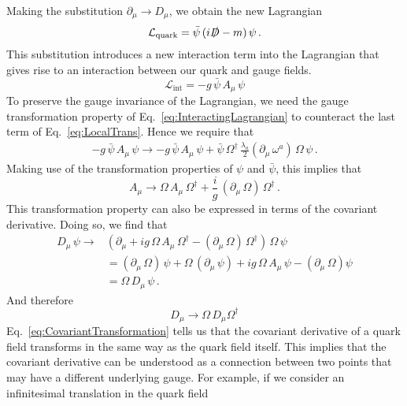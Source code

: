 Making the substitution $\partial_\mu\rightarrow D_\mu$, we obtain the new Lagrangian
%
\begin{equation}
\mathcal{L}_\text{quark} = \bar{\psi}\,(i\slashed{D}-m)\,\psi\,.
\end{equation}
%
This substitution introduces a new interaction term into the Lagrangian that gives rise to an interaction between our quark and gauge fields.
%
\begin{equation}
\mathcal{L}_\text{int} = -g\,\bar{\psi}\,A_\mu\,\psi
\label{eq:InteractingLagrangian}
\end{equation}
%
To preserve the gauge invariance of the Lagrangian, we need the gauge transformation property of Eq.~\ref{eq:InteractingLagrangian} to counteract the last term of Eq.~\ref{eq:LocalTrans}. Hence we require that
%
\begin{align}
-g\,\bar{\psi}\,A_\mu\,\psi \rightarrow -g\,\bar{\psi}\,A_\mu\,\psi + \bar{\psi}\,\Omega^\dag\,\frac{\lambda_a}{2}(\partial_\mu\,\omega^a)\,\Omega\,\psi\, .
\end{align}
%
Making use of the transformation properties of $\psi$ and $\bar{\psi}$, this implies that
%
\begin{equation}
A_\mu\rightarrow \Omega\,A_\mu\,\Omega^\dag + \frac{i}{g}\,(\partial_\mu\,\Omega)\,\Omega^\dag\, . 
\label{eq:GaugePotentialTrans}
\end{equation}
%
This transformation property can also be expressed in terms of the covariant derivative. Doing so, we find that
%
\begin{align}
D_\mu\,\psi \rightarrow &\left(\partial_\mu +ig\,\Omega\,A_\mu\,\Omega^\dag - (\partial_\mu\,\Omega)\,\Omega^\dag\right)\,\Omega\,\psi\nonumber\\
&= (\partial_\mu\,\Omega)\,\psi + \Omega\,(\partial_\mu\,\psi) + ig\,\Omega\,A_\mu\,\psi - (\partial_\mu\,\Omega)\psi\nonumber\\
&=\Omega\,D_\mu\,\psi\, .\label{eq:CovariantTransformation}
\end{align}
%
And therefore
%
\begin{equation}
D_{\mu}\rightarrow\Omega\,D_\mu \Omega^\dag
\end{equation}
%
Eq.~\ref{eq:CovariantTransformation} tells us that the covariant derivative of a quark field transforms in the same way as the quark field itself. This implies that the covariant derivative can be understood as a connection between two points that may have a different underlying gauge. For example, if we consider an infinitesimal translation in the quark field
%
